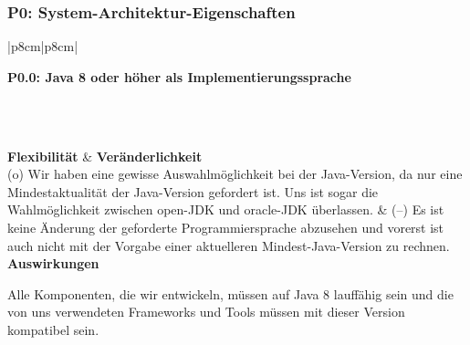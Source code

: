 \documentclass[enabledeprecatedfontcommands,fontsize=11pt,paper=a4,twoside]{scrartcl}
\newcounter{one}
\newcounter{two}[one]
\newcommand{\tone}{0\theone}
\newcommand{\two}{\stepcounter{two}0\thetwo}
\newcommand\s{\rule{0pt}{4ex}}
\begin{document}
\subsubsection*{\hypertarget{a}{P\tone}: System-Architektur-Eigenschaften} 
\begin{tabular}{|p{8cm}|p{8cm}|}
	\hline
	 { \parbox{16cm}{\textbf{\hypertarget{b}{P\tone.\two}: Java 8 oder höher als Implementierungssprache} }} \\  
	\hline\hline 
	\s\\ [1ex]
	\hline
	\textbf{Flexibilität}  & \textbf{Veränderlichkeit} \\ 
	(o) Wir haben eine gewisse Auswahlmöglichkeit bei der Java-Version, da nur eine Mindestaktualität der Java-Version gefordert ist. Uns ist sogar die 			Wahlmöglichkeit zwischen open-JDK und oracle-JDK überlassen. &
	(--) Es ist keine Änderung der geforderte Programmiersprache abzusehen und vorerst ist auch nicht mit
	der Vorgabe einer aktuelleren Mindest-Java-Version
	zu rechnen.
	\\ \hline
	 {\textbf{Auswirkungen}} \\ 
	 {\parbox{16cm}{Alle Komponenten, die wir entwickeln, müssen auf Java 8 lauffähig sein und die von uns verwendeten Frameworks und Tools müssen mit dieser Version kompatibel sein.} }\\ \hline
\end{tabular}
\\ \\ \\ \\ \\ 
\end{document}
